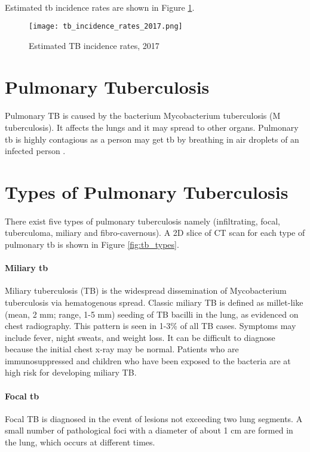 \paragraph{}
Estimated \ac{tb} incidence rates are shown in Figure \ref{tb_incidence_rates_2017}.
\begin{figure}[ht]
 \texttt{[image: tb\_incidence\_rates\_2017.png]}
 \caption{Estimated TB incidence rates, 2017 \cite{TBT:3}}
 \label{tb_incidence_rates_2017}
\end{figure}
\section{Pulmonary Tuberculosis}
\paragraph{}
Pulmonary TB is caused by the bacterium Mycobacterium tuberculosis (M tuberculosis). It affects the lungs and it may spread to other organs. Pulmonary \ac{tb} is highly contagious as a person may get \ac{tb} by breathing in air droplets of an infected person \cite{TBT:4}.
\section{Types of Pulmonary Tuberculosis}
\paragraph{}
There exist five types of pulmonary tuberculosis namely (infiltrating, focal, tuberculoma, miliary and fibro-cavernous). A 2D slice of CT scan for each type of pulmonary \ac{tb} is shown in Figure \ref{fig:tb_types}.
\paragraph{Miliary \ac{tb}}
Miliary tuberculosis (TB) is the widespread dissemination of Mycobacterium tuberculosis via hematogenous spread. Classic miliary TB is defined as millet-like (mean, 2 mm; range, 1-5 mm) seeding of TB bacilli in the lung, as evidenced on chest radiography. This pattern is seen in 1-3\% of all TB cases.
Symptoms may include fever, night sweats, and weight loss. It can be difficult to diagnose because the initial chest x-ray may be normal. Patients who are immunosuppressed and children who have been exposed to the bacteria are at high risk for developing miliary TB.\cite{TBMIL:1, TBMIL:2, TBMIL:3, TBMIL:4}
\paragraph{Focal \ac{tb}}
Focal TB is diagnosed in the event of lesions not exceeding two lung segments. A small number of pathological foci with a diameter of about 1 cm are formed in the lung, which occurs at different times.\cite{TBFOC:1}
